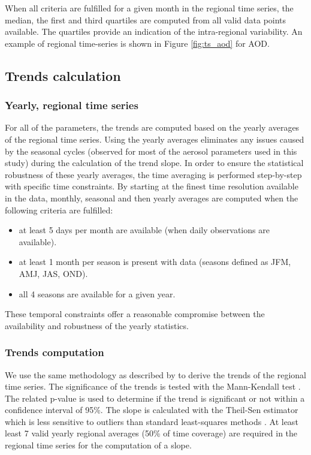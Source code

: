\documentclass[acp, manuscript]{copernicus}
\begin{document}
When all criteria are fulfilled for a given month in the regional time series, the median, the first and third quartiles are computed from all valid data points available. The quartiles provide an indication of the intra-regional variability. An example of regional time-series is shown in Figure \ref{fig:ts_aod} for AOD.


\subsection{Trends calculation}

\subsubsection{Yearly, regional time series}
For all of the parameters, the trends are computed based on the yearly averages of the regional time series. Using the yearly averages eliminates any issues caused by the seasonal cycles (observed for most of the aerosol parameters used in this study) during the calculation of the trend slope. In order to ensure the statistical robustness of these yearly averages, the time averaging is performed step-by-step with specific time constraints. By starting at the finest time resolution available in the data, monthly, seasonal and then yearly averages are computed when the following criteria are fulfilled:
\begin{itemize}
 \item at least 5 days per month are available (when daily observations are available).
 \item at least 1 month per season is present with data (seasons defined as JFM, AMJ, JAS, OND).
 \item all 4 seasons are available for a given year.
\end{itemize}
These temporal constraints offer a reasonable compromise between the availability and robustness of the yearly statistics.

\subsubsection{Trends computation}
We use the same methodology as described by \cite{aas2019global} to derive the trends of the regional time series. The significance of the trends is tested with the Mann-Kendall test \citep{hamed1998modified}. The related p-value is used to determine if the trend is significant or not within a confidence interval of 95\%. The slope is calculated with the Theil-Sen estimator which is less sensitive to outliers than standard least-squares methods \citep{sen1968estimates}. At least least 7 valid yearly regional averages (50\% of time coverage) are required in the regional time series for the computation of a slope.
\end{document}
